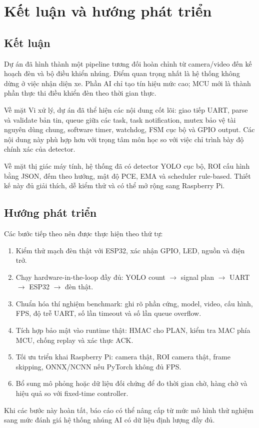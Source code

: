 \section{Kết luận và hướng phát triển}

\subsection{Kết luận}

Dự án \projectname{} đã hình thành một pipeline tương đối hoàn chỉnh từ camera/video đến kế hoạch đèn và bộ điều khiển nhúng. Điểm quan trọng nhất là hệ thống không dừng ở việc nhận diện xe. Phần AI chỉ tạo tín hiệu mức cao; MCU mới là thành phần thực thi điều khiển đèn theo thời gian thực.

Về mặt Vi xử lý, dự án đã thể hiện các nội dung cốt lõi: giao tiếp UART, parse và validate bản tin, queue giữa các task, task notification, mutex bảo vệ tài nguyên dùng chung, software timer, watchdog, FSM cục bộ và GPIO output. Các nội dung này phù hợp hơn với trọng tâm môn học so với việc chỉ trình bày độ chính xác của detector.

Về mặt thị giác máy tính, hệ thống đã có detector YOLO cục bộ, ROI cấu hình bằng JSON, đếm theo hướng, mật độ PCE, EMA và scheduler rule-based. Thiết kế này đủ giải thích, dễ kiểm thử và có thể mở rộng sang Raspberry Pi.

\subsection{Hướng phát triển}

Các bước tiếp theo nên được thực hiện theo thứ tự:

\begin{enumerate}
  \item Kiểm thử mạch đèn thật với ESP32, xác nhận GPIO, LED, nguồn và điện trở.
  \item Chạy hardware-in-the-loop đầy đủ: YOLO count \(\rightarrow\) signal plan \(\rightarrow\) UART \(\rightarrow\) ESP32 \(\rightarrow\) đèn thật.
  \item Chuẩn hóa thí nghiệm benchmark: ghi rõ phần cứng, model, video, cấu hình, FPS, độ trễ UART, số lần timeout và số lần queue overflow.
  \item Tích hợp bảo mật vào runtime thật: HMAC cho PLAN, kiểm tra MAC phía MCU, chống replay và xác thực ACK.
  \item Tối ưu triển khai Raspberry Pi: camera thật, ROI camera thật, frame skipping, ONNX/NCNN nếu PyTorch không đủ FPS.
  \item Bổ sung mô phỏng hoặc dữ liệu đối chứng để đo thời gian chờ, hàng chờ và hiệu quả so với fixed-time controller.
\end{enumerate}

Khi các bước này hoàn tất, báo cáo có thể nâng cấp từ mức mô hình thử nghiệm sang mức đánh giá hệ thống nhúng AI có dữ liệu định lượng đầy đủ.
